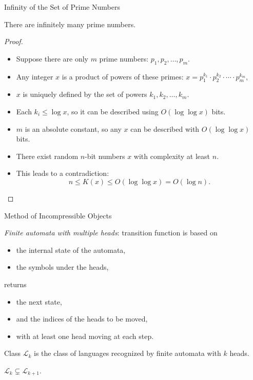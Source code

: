 \documentclass[aspectratio=169]{beamer}
\newcommand{\pitem}{\pause\item}
\newcommand{\seqn}[2]{{#1}_1,{#1}_2,\dotsc,{#1}_{#2}}
\begin{document}
\begin{frame}{Infinity of the Set of Prime Numbers}
\begin{theorem}
    There are infinitely many prime numbers.
\end{theorem}
\begin{proof}
    \begin{itemize}
        \item Suppose there are only $m$ prime numbers: $\seqn{p}{m}$.
        \pitem Any integer $x$ is a product of powers of these primes:
        $
        x = p_1^{k_1}\cdot p_2^{k_2}\cdot\dotsm\cdot p_m^{k_m},
        $
        \pitem $x$ is uniquely defined by the set of powers $\seqn{k}{m}$.

        \pitem Each $k_i \le \log x$, so it can be described using $O(\log \log x)$ bits.

        \pitem $m$ is an absolute constant, so any $x$ can be described with $O(\log \log x)$ bits.

        \pitem There exist random $n$-bit numbers $x$ with complexity at least $n$.

        \pitem
        This leads to a contradiction:
        \[
        n \le K(x) \le O(\log \log x) = O(\log n).
        \]
    \end{itemize}
\end{proof}

\end{frame}


\begin{frame}{Method of Incompressible Objects}
    \begin{definition}
        \emph{Finite automata with multiple heads}: transition function is based on
        \begin{itemize}
            \item the internal state of the automata,
            \item the symbols under the heads,
        \end{itemize}
        returns
        \begin{itemize}
            \item the next state,
            \item and the indices of the heads to be moved,
            \item with at least one head moving at each step.
        \end{itemize}
    \end{definition}

    Class $\mathcal{L}_k$ is the class of languages recognized by finite automata with $k$ heads.

    \begin{theorem}\label{thm:kDFA}
        $\mathcal{L}_k \subsetneq \mathcal{L}_{k+1}$.
    \end{theorem}

\end{frame}
\end{document}
